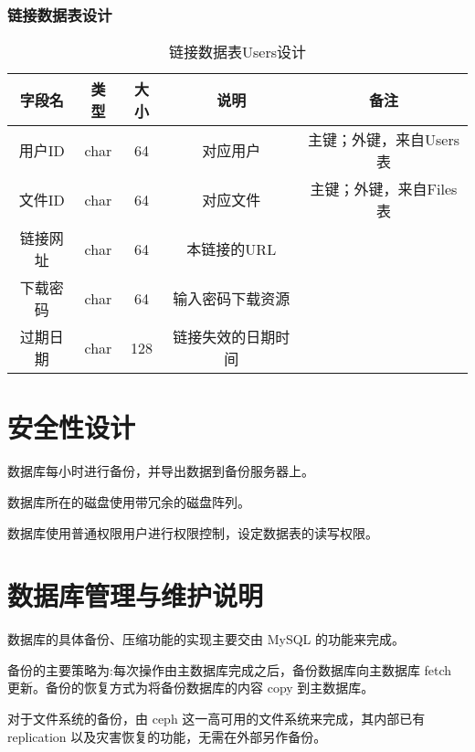 \subsubsection{链接数据表设计}
\begin{table}[htbp]
\centering
\caption{链接数据表Users设计} \label{tab:link-database}
\begin{tabular}{|c|c|c|c|c|}
    \hline
    字段名 & 类型 & 大小 & 说明 & 备注 \\
    \hline
    用户ID & char & 64 & 对应用户 & 主键；外键，来自Users表\\
    \hline
    文件ID & char & 64 & 对应文件 & 主键；外键，来自Files表\\
    \hline
    链接网址 & char & 64 & 本链接的URL & \\
    \hline
    下载密码 & char & 64 & 输入密码下载资源 & \\
    \hline
    过期日期 & char & 128 & 链接失效的日期时间 & \\
    \hline
\end{tabular}
\end{table}

\section{安全性设计}
数据库每小时进行备份，并导出数据到备份服务器上。

数据库所在的磁盘使用带冗余的磁盘阵列。

数据库使用普通权限用户进行权限控制，设定数据表的读写权限。

\section{数据库管理与维护说明}
数据库的具体备份、压缩功能的实现主要交由 MySQL 的功能来完成。

备份的主要策略为:每次操作由主数据库完成之后，备份数据库向主数据库 fetch 更新。备份的恢复方式为将备份数据库的内容 copy 到主数据库。

对于文件系统的备份，由 ceph 这一高可用的文件系统来完成，其内部已有 replication 以及灾害恢复的功能，无需在外部另作备份。